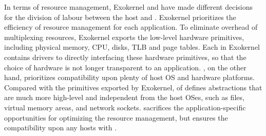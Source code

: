 In terms of resource management,
Exokernel and \graphene{} have made different decisions for
the division of labour
between the host and \libos{}. %
Exokernel prioritizes the efficiency of resource management for each application. 
To eliminate overhead of multiplexing resources,
Exokernel exports the low-level hardware primitives, including physical memory, CPU, disks, TLB and page tables. 
Each \libos{} in Exokernel contains drivers to directly interfacing
these hardware primitives,
so that the choice of hardware is not longer
transparent to an application.
\graphene{}, on the other hand, prioritizes compatibility upon plenty of host OS and hardware platforms.
Compared with the primitives exported by Exokernel,
\thehostabi{} of \graphene{} defines abstractions
that are much more high-level and independent from the host OSes, such as files, virtual memory areas, and network sockets.
\graphene{} sacrifices the application-specific opportunities
for optimizing the resource management,
but ensures the compatibility upon any hosts with \thehostabi{}.






















